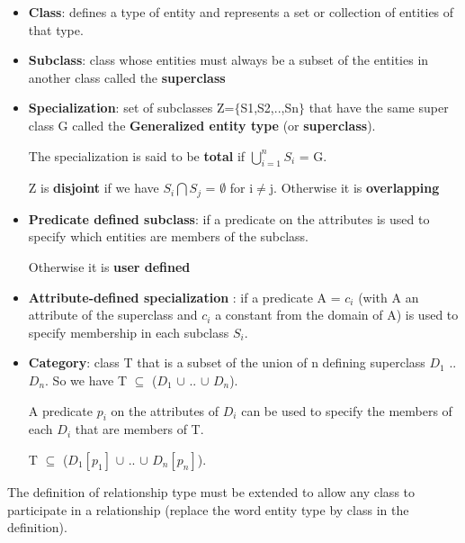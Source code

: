 \begin{itemize}
    \item \textbf{Class}: defines a type of entity and represents a set or collection of entities of that type.
    
    \item \textbf{Subclass}: class whose entities must always be a subset of the entities in another class called the \textbf{superclass}
    
    \item \textbf{Specialization}: set of subclasses Z=$\big\{$S1,S2,..,Sn$\big\}$ that have the same super class G called the \textbf{Generalized entity type} (or \textbf{superclass}). 
    
    The specialization is said to be \textbf{total} if $\bigcup_{i=1}^n S_i$ = G. 
    
    Z is \textbf{disjoint} if we have $S_i \bigcap S_j$ = $\emptyset$ for i$\neq$j. Otherwise it is \textbf{overlapping}
    
    \item \textbf{Predicate defined subclass}: if a predicate on the attributes is used to specify which entities are members of the subclass.
    
    Otherwise it is \textbf{user defined}
    
    \item \textbf{Attribute-defined specialization} : if a predicate A = $c_i$ (with A an attribute of the superclass and $c_i$ a constant from the domain of A) is used to specify membership in each subclass $S_i$.
    
    \item \textbf{Category}: class T that is a subset of the union of n defining superclass $D_1$ .. $D_n$. So we have T $\subseteq$ ($D_1$ $\cup$ .. $\cup$ $D_n$).
    
    A predicate $p_i$ on the attributes of $D_i$ can be used to specify the members of each $D_i$ that are members of T.
    
    T $\subseteq$ ($D_{1}[p_1]$ $\cup$ .. $\cup$ $D_{n}[p_n]$).
 \end{itemize}
 
 The definition of relationship type must be extended to allow any class to participate in a relationship (replace the word entity type by class in the definition).
 
 
